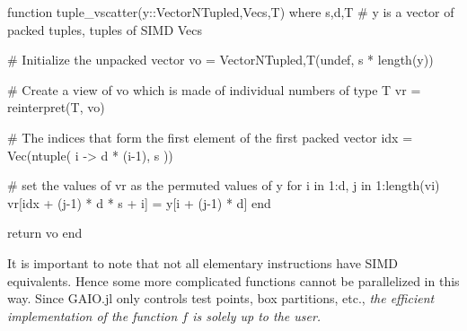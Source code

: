 \begin{jllisting}[float, floatplacement=ht!, language=julia, style=jlcodestyle, label=lst:tuple_vscatter, caption=Conversion back to single tuples]
    function tuple_vscatter(y::Vector{NTuple{d,Vec{s,T}}}) where {s,d,T}
        # y is a vector of packed tuples, tuples of SIMD Vecs

        # Initialize the unpacked vector
        vo = Vector{NTuple{d,T}}(undef, s * length(y))

        # Create a view of vo which is made of individual numbers of type T 
        vr = reinterpret(T, vo)

        # The indices that form the first element of the first packed vector
        idx = Vec(ntuple( i -> d * (i-1), s ))

        # set the values of vr as the permuted values of y
        for i in 1:d, j in 1:length(vi)
            vr[idx + (j-1) * d * s + i] = y[i + (j-1) * d]
        end

        return vo
    end
\end{jllisting}



It is important to note that not all elementary instructions have SIMD equivalents. Hence 
some more complicated functions cannot be parallelized in this way. Since GAIO.jl only 
controls test points, box partitions, etc., \emph{
the efficient implementation of the function $f$ is solely up to the user.
}

